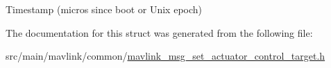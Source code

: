Timestamp (micros since boot or Unix epoch) 



The documentation for this struct was generated from the following file\+:\begin{DoxyCompactItemize}
\item 
src/main/mavlink/common/\hyperlink{mavlink__msg__set__actuator__control__target_8h}{mavlink\+\_\+msg\+\_\+set\+\_\+actuator\+\_\+control\+\_\+target.\+h}\end{DoxyCompactItemize}
